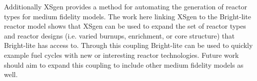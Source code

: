 \documentclass{article}
\begin{document}
Additionally XSgen provides a method for automating the generation of reactor types for medium fidelity models. The work here linking XSgen to the Bright-lite reactor model shows that XSgen can be used to expand the set of reactor types and reactor designs (i.e. varied burnups, enrichment, or core structure) that Bright-lite has access to. Through this coupling Bright-lite can be used to quickly example fuel cycles with new or interesting reactor technologies. Future work should aim to expand this coupling to include other medium fidelity models as well.


 

\end{document}
